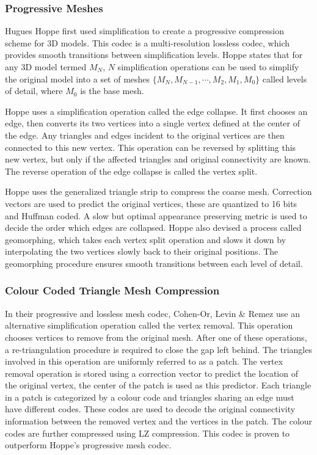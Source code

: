 \subsubsection{Progressive Meshes}

Hugues Hoppe \cite{Hoppe96Progressive} first used simplification to create a progressive compression scheme for 3D models. This codec is a multi-resolution lossless codec, which provides smooth transitions between simplification levels. Hoppe states that for any 3D model termed $M_N$, $N$ simplification operations can be used to simplify the original model into a set of meshes $\{M_N , M_{N-1} , \cdots , M_2 , M_1, M_0 \}$ called levels of detail, where $M_0$ is the base mesh. 

Hoppe uses a simplification operation called the edge collapse. It first chooses an edge, then converts its two vertices into a single vertex defined at the center of the edge. Any triangles and edges incident to the original vertices are then connected to this new vertex. This operation can be reversed by splitting this new vertex, but only if the affected triangles and original connectivity are known. The reverse operation of the edge collapse is called the vertex split.

Hoppe uses the generalized triangle strip to compress the coarse mesh. Correction vectors are used to predict the original vertices, these are quantized to 16 bits and Huffman coded.  A slow but optimal appearance preserving metric is used to decide the order which edges are collapsed. Hoppe also devised a process called geomorphing, which takes each vertex split operation and slows it down by interpolating the two vertices slowly back to their original positions. The geomorphing procedure ensures smooth transitions between each level of detail. 

\subsubsection{Colour Coded Triangle Mesh Compression}

In their progressive and lossless mesh codec, Cohen-Or, Levin \& Remez \cite{CohenOr99Progressive} use an alternative simplification operation called the vertex removal. This operation chooses vertices to remove from the original mesh. After one of these operations, a re-triangulation procedure is required to close the gap left behind. The triangles involved in this operation are uniformly referred to as a patch. The vertex removal operation is stored using a correction vector to predict the location of the original vertex, the center of the patch is used as this predictor. Each triangle in a patch is categorized by a colour code and triangles sharing an edge must have different codes. These codes are used to decode the original connectivity information between the removed vertex and the vertices in the patch. The colour codes are further compressed using LZ compression. This codec is proven to outperform Hoppe's \cite{Hoppe96Progressive} progressive mesh codec.

